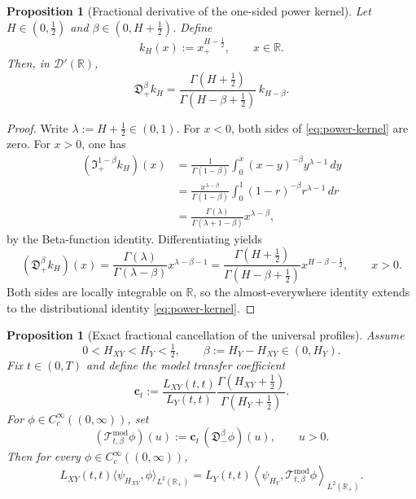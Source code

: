 \documentclass[11pt,a4paper]{amsart}
\theoremstyle{plain}
\newtheorem{proposition}[theorem]{Proposition}
\theoremstyle{definition}
\theoremstyle{remark}
\newcommand{\R}{\mathbb{R}}
\begin{document}
\begin{proposition}[Fractional derivative of the one-sided power kernel]
\label{prop:power-kernel}
Let $H\in(0,\tfrac12)$ and $\beta\in(0,H+\tfrac12)$. Define
\begin{equation}\label{eq:kH}
k_H(x):=x_+^{H-\frac12},
\qquad x\in\R.
\end{equation}
Then, in $\mathcal D'(\R)$,
\begin{equation}\label{eq:power-kernel}
\mathfrak D_+^\beta k_H
=
\frac{\Gamma(H+\frac12)}{\Gamma(H-\beta+\frac12)}\,k_{H-\beta}.
\end{equation}
\end{proposition}

\begin{proof}
Write $\lambda:=H+\tfrac12\in(0,1)$. For $x<0$, both sides of \eqref{eq:power-kernel} are
zero. For $x>0$, one has
\begin{align*}
(\mathfrak I_+^{1-\beta}k_H)(x)
&=
\frac{1}{\Gamma(1-\beta)}
\int_0^x (x-y)^{-\beta}y^{\lambda-1}\,dy \\
&=
\frac{x^{\lambda-\beta}}{\Gamma(1-\beta)}
\int_0^1 (1-r)^{-\beta}r^{\lambda-1}\,dr \\
&=
\frac{\Gamma(\lambda)}{\Gamma(\lambda+1-\beta)}x^{\lambda-\beta},
\end{align*}
by the Beta-function identity. Differentiating yields
\[
(\mathfrak D_+^\beta k_H)(x)
=
\frac{\Gamma(\lambda)}{\Gamma(\lambda-\beta)}x^{\lambda-\beta-1}
=
\frac{\Gamma(H+\frac12)}{\Gamma(H-\beta+\frac12)}x^{H-\beta-\frac12},
\qquad x>0.
\]
Both sides are locally integrable on $\R$, so the almost-everywhere identity extends to the
distributional identity \eqref{eq:power-kernel}.
\end{proof}

\begin{proposition}[Exact fractional cancellation of the universal profiles]
\label{prop:model-cancel}
Assume
\[
0<H_{XY}<H_Y<\tfrac12,
\qquad
\beta:=H_Y-H_{XY}\in(0,H_Y).
\]
Fix $t\in(0,T)$ and define the model transfer coefficient
\begin{equation}\label{eq:model-coeff}
\mathbf c_t
:=
\frac{L_{XY}(t,t)}{L_Y(t,t)}
\frac{\Gamma(H_{XY}+\frac12)}{\Gamma(H_Y+\frac12)}.
\end{equation}
For $\phi\in C_c^\infty((0,\infty))$, set
\begin{equation}\label{eq:model-transfer}
(\mathcal T_{t,\beta}^{\mathrm{mod}}\phi)(u)
:=
\mathbf c_t\,(\mathfrak D_-^\beta \phi)(u),
\qquad u>0.
\end{equation}
Then for every $\phi\in C_c^\infty((0,\infty))$,
\begin{equation}\label{eq:model-cancel}
L_{XY}(t,t)\langle \psi_{H_{XY}},\phi\rangle_{L^2(\R_+)}
=
L_Y(t,t)
\left\langle
\psi_{H_Y},
\mathcal T_{t,\beta}^{\mathrm{mod}}\phi
\right\rangle_{L^2(\R_+)}.
\end{equation}
\end{proposition}
\end{document}
